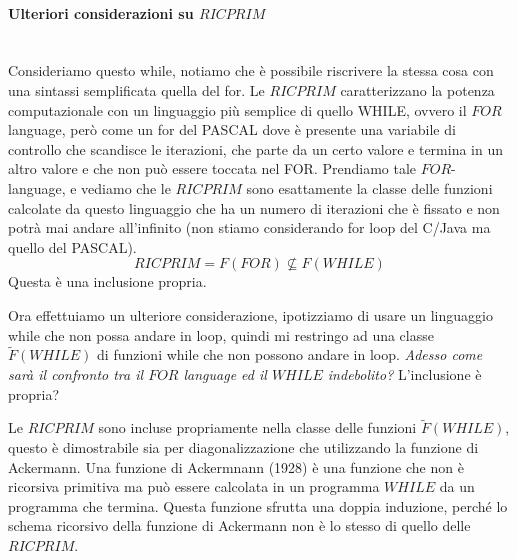 \documentclass{article}
\begin{document}
\paragraph{Ulteriori considerazioni su $RICPRIM$}\mbox{}\\
Consideriamo questo while, notiamo che è possibile riscrivere la stessa cosa
con una sintassi semplificata quella del for.
Le $RICPRIM$ caratterizzano la potenza computazionale con un linguaggio più semplice
di quello WHILE, ovvero il $FOR$ language, però come un for del PASCAL dove è presente
una variabile di controllo che scandisce le iterazioni, che parte da un certo valore
e termina in un altro valore e che non può essere toccata nel FOR.
Prendiamo tale $FOR$-language, e vediamo che le $RICPRIM$ sono esattamente la classe delle funzioni
calcolate da questo linguaggio che ha un numero di iterazioni che è fissato e non
potrà mai andare all'infinito (non stiamo considerando for loop del C/Java ma quello del PASCAL).
$$RICPRIM=F(FOR)\nsubseteq F(WHILE)$$
Questa è una inclusione propria.

Ora effettuiamo un ulteriore considerazione, ipotizziamo di usare un linguaggio while
che non possa andare in loop, quindi mi restringo ad una classe $\tilde{F}(WHILE)$
di funzioni while che non possono andare in loop. \textit{Adesso come sarà il
    confronto tra il $FOR$ language ed il $WHILE$ indebolito?} L'inclusione è propria?

Le $RICPRIM$ sono incluse propriamente nella classe delle funzioni $\tilde{F}(WHILE)$,
questo è dimostrabile sia per diagonalizzazione che utilizzando la funzione di Ackermann.
Una funzione di Ackermnann (1928) è una funzione che non è ricorsiva primitiva ma
può essere calcolata in un programma $WHILE$ da un programma che termina.
Questa funzione sfrutta una doppia induzione, perché lo schema ricorsivo della funzione
di Ackermann non è lo stesso di quello delle $RICPRIM$.
\end{document}
